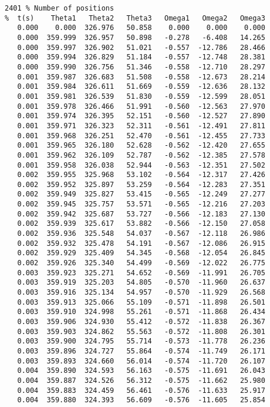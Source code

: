 \begin{verbatim}
2401 % Number of positions
%  t(s)    Theta1   Theta2   Theta3   Omega1   Omega2   Omega3
   0.000    0.000  326.976   50.858    0.000    0.000    0.000
   0.000  359.999  326.957   50.898   -0.278   -6.408   14.265
   0.000  359.997  326.902   51.021   -0.557  -12.786   28.466
   0.000  359.994  326.829   51.184   -0.557  -12.748   28.381
   0.000  359.990  326.756   51.346   -0.558  -12.710   28.297
   0.001  359.987  326.683   51.508   -0.558  -12.673   28.214
   0.001  359.984  326.611   51.669   -0.559  -12.636   28.132
   0.001  359.981  326.539   51.830   -0.559  -12.599   28.051
   0.001  359.978  326.466   51.991   -0.560  -12.563   27.970
   0.001  359.974  326.395   52.151   -0.560  -12.527   27.890
   0.001  359.971  326.323   52.311   -0.561  -12.491   27.811
   0.001  359.968  326.251   52.470   -0.561  -12.455   27.733
   0.001  359.965  326.180   52.628   -0.562  -12.420   27.655
   0.001  359.962  326.109   52.787   -0.562  -12.385   27.578
   0.001  359.958  326.038   52.944   -0.563  -12.351   27.502
   0.002  359.955  325.968   53.102   -0.564  -12.317   27.426
   0.002  359.952  325.897   53.259   -0.564  -12.283   27.351
   0.002  359.949  325.827   53.415   -0.565  -12.249   27.277
   0.002  359.945  325.757   53.571   -0.565  -12.216   27.203
   0.002  359.942  325.687   53.727   -0.566  -12.183   27.130
   0.002  359.939  325.617   53.882   -0.566  -12.150   27.058
   0.002  359.936  325.548   54.037   -0.567  -12.118   26.986
   0.002  359.932  325.478   54.191   -0.567  -12.086   26.915
   0.002  359.929  325.409   54.345   -0.568  -12.054   26.845
   0.002  359.926  325.340   54.499   -0.569  -12.022   26.775
   0.003  359.923  325.271   54.652   -0.569  -11.991   26.705
   0.003  359.919  325.203   54.805   -0.570  -11.960   26.637
   0.003  359.916  325.134   54.957   -0.570  -11.929   26.568
   0.003  359.913  325.066   55.109   -0.571  -11.898   26.501
   0.003  359.910  324.998   55.261   -0.571  -11.868   26.434
   0.003  359.906  324.930   55.412   -0.572  -11.838   26.367
   0.003  359.903  324.862   55.563   -0.572  -11.808   26.301
   0.003  359.900  324.795   55.714   -0.573  -11.778   26.236
   0.003  359.896  324.727   55.864   -0.574  -11.749   26.171
   0.003  359.893  324.660   56.014   -0.574  -11.720   26.107
   0.004  359.890  324.593   56.163   -0.575  -11.691   26.043
   0.004  359.887  324.526   56.312   -0.575  -11.662   25.980
   0.004  359.883  324.459   56.461   -0.576  -11.633   25.917
   0.004  359.880  324.393   56.609   -0.576  -11.605   25.854

\end{verbatim}
